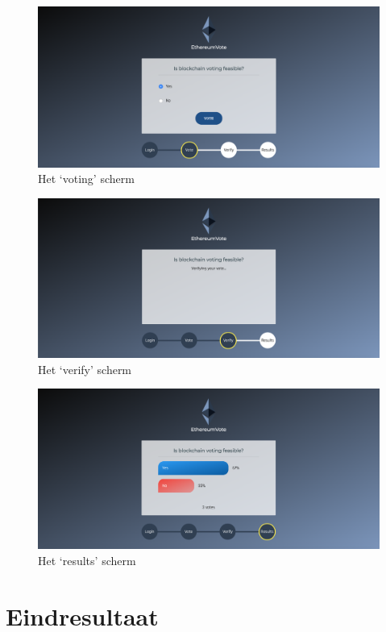 	\begin{figure}[h!]
		\centering
		\includegraphics[width=\linewidth]{img/vote.png}
		\caption{Het `voting' scherm}
		\label{fig:vote}
	\end{figure}
	\begin{figure}[h!]
		\centering
		\includegraphics[width=\linewidth]{img/verify.png}
		\caption{Het `verify' scherm}
		\label{fig:verify}
	\end{figure}
	\begin{figure}[h!]
		\centering
		\includegraphics[width=\linewidth]{img/results.png}
		\caption{Het `results' scherm}
		\label{fig:results}
	\end{figure}
	\newpage
	\section{Eindresultaat}
